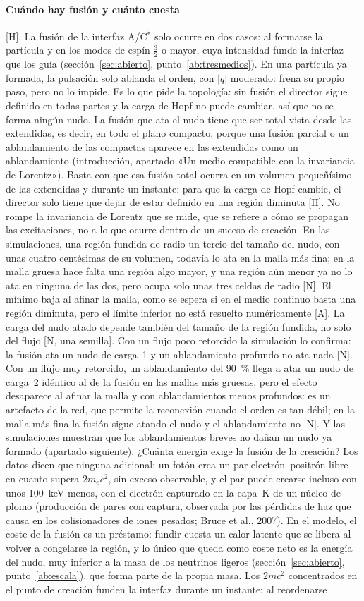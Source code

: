 \documentclass[11pt,a4paper]{article}
\newcommand{\st}[1]{\textup{[#1]}}
\newcommand{\Cst}{C\ensuremath{^{*}}}
\newcommand{\apartado}[1]{\paragraph{#1}}
\begin{document}
\apartado{Cuándo hay fusión y cuánto cuesta} \st{H}. La fusión de la interfaz A/\Cst{} solo ocurre en dos casos: al formarse la partícula y en los modos de espín $\tfrac32$ o mayor, cuya intensidad funde la interfaz que los guía (sección~\ref{sec:abierto}, punto~\ref{ab:tresmedios}). En una partícula ya formada, la pulsación solo ablanda el orden, con $|q|$ moderado: frena su propio paso, pero no lo impide. Es lo que pide la topología: sin fusión el director sigue definido en todas partes y la carga de Hopf no puede cambiar, así que no se forma ningún nudo. La fusión que ata el nudo tiene que ser total vista desde las extendidas, es decir, en todo el plano compacto, porque una fusión parcial o un ablandamiento de las compactas aparece en las extendidas como un ablandamiento (introducción, apartado «Un medio compatible con la invariancia de Lorentz»). Basta con que esa fusión total ocurra en un volumen pequeñísimo de las extendidas y durante un instante: para que la carga de Hopf cambie, el director solo tiene que dejar de estar definido en una región diminuta \st{H}. No rompe la invariancia de Lorentz que se mide, que se refiere a cómo se propagan las excitaciones, no a lo que ocurre dentro de un suceso de creación. En las simulaciones, una región fundida de radio un tercio del tamaño del nudo, con unas cuatro centésimas de su volumen, todavía lo ata en la malla más fina; en la malla gruesa hace falta una región algo mayor, y una región aún menor ya no lo ata en ninguna de las dos, pero ocupa solo unas tres celdas de radio \st{N}. El mínimo baja al afinar la malla, como se espera si en el medio continuo basta una región diminuta, pero el límite inferior no está resuelto numéricamente \st{A}. La carga del nudo atado depende también del tamaño de la región fundida, no solo del flujo \st{N, una semilla}. Con un flujo poco retorcido la simulación lo confirma: la fusión ata un nudo de carga~1 y un ablandamiento profundo no ata nada \st{N}. Con un flujo muy retorcido, un ablandamiento del 90~\% llega a atar un nudo de carga~2 idéntico al de la fusión en las mallas más gruesas, pero el efecto desaparece al afinar la malla y con ablandamientos menos profundos: es un artefacto de la red, que permite la reconexión cuando el orden es tan débil; en la malla más fina la fusión sigue atando el nudo y el ablandamiento no \st{N}. Y las simulaciones muestran que los ablandamientos breves no dañan un nudo ya formado (apartado siguiente). ¿Cuánta energía exige la fusión de la creación? Los datos dicen que ninguna adicional: un fotón crea un par electrón--positrón libre en cuanto supera $2m_ec^2$, sin exceso observable, y el par puede crearse incluso con unos 100~keV menos, con el electrón capturado en la capa~K de un núcleo de plomo (producción de pares con captura, observada por las pérdidas de haz que causa en los colisionadores de iones pesados; Bruce et al., 2007). En el modelo, el coste de la fusión es un préstamo: fundir cuesta un calor latente que se libera al volver a congelarse la región, y lo único que queda como coste neto es la energía del nudo, muy inferior a la masa de los neutrinos ligeros (sección~\ref{sec:abierto}, punto~\ref{ab:escala}), que forma parte de la propia masa. Los $2mc^2$ concentrados en el punto de creación funden la interfaz durante un instante; al reordenarse 
\end{document}
